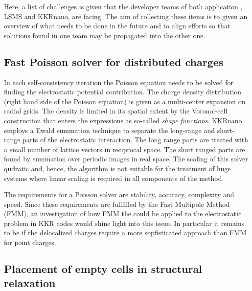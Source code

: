 \documentclass{llncs}
\def\KKRnano{{KKRnano}}
\def\LSMS{{LSMS}}
\begin{document}
Here, a list of challenges is given that the developer teams of both application , \LSMS{} and \KKRnano{}, are
facing. The aim of collecting these items is to given an overview of what needs to be done in the future
and to align efforts so that solutions found in one team may be propagated into the other one.

\subsection{Fast Poisson solver for distributed charges} %
In each self-consistency iteration the Poisson equation needs to be solved for finding the
electrostatic potential contribution. The charge density distribution (right hand side of the Poisson equation)
is given as a multi-center expansion on radial grids. The density is limited in its spatial extent
by the Voronoi-cell construction that enters the expressions as so-called \emph{shape functions}.
\KKRnano{} employs a Ewald summation technique to separate the long-range and short-range parts of the electrostatic interaction.
The long range parts are treated with a small number of lattice vectors in reciprocal space. The short ranged parts
are found by summation over periodic images in real space.
The scaling of this solver qudratic  and, hence, the algorithm is not suitable
for the treatment of huge systems where linear scaling is required in all components of the method.

The requirements for a Poisson solver are stability, accuracy, complexity and speed.
Since these requirements are fullfilled by the Fast Multipole Method (FMM), 
an investigation of how FMM the could be applied to the
electrostatic problem in KKR codes would shine light into this issue.
In particular it remains to be if the delocalized charges require a more
sopfisticated approach than FMM for point charges.

\subsection{Placement of empty cells in structural relaxation} %
\end{document}
